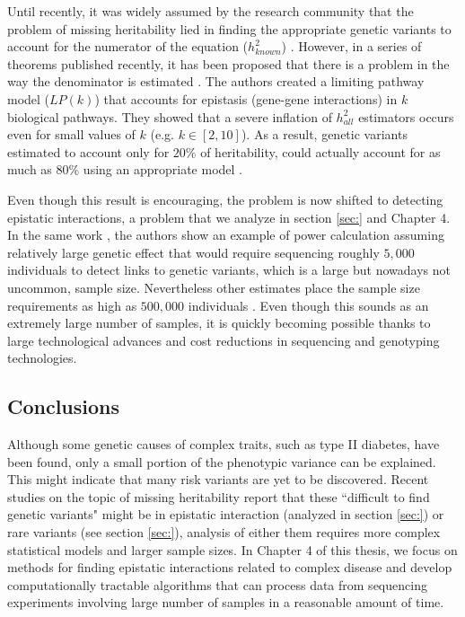 Until recently, it was widely assumed by the research community that the problem of missing heritability lied in finding the appropriate genetic variants to account for the numerator of the equation ($h^2_{known}$) \cite{zuk2012mystery}. However, in a series of theorems published recently, it has been proposed that there is a problem in the way the denominator is estimated \cite{zuk2012mystery}. The authors created a limiting pathway model ($LP(k)$) that accounts for epistasis (gene-gene interactions) in $k$ biological pathways. They showed that a severe inflation of $h^2_{all}$ estimators occurs even for small values of $k$ (e.g. $k \in [2,10]$). As a result, genetic variants estimated to account only for $20\%$ of heritability, could actually account for as much as $80\%$ using an appropriate model \cite{zuk2012mystery}.

Even though this result is encouraging, the problem is now shifted to detecting epistatic interactions, a problem that we analyze in section \ref{sec:} and Chapter 4. In the same work \cite{zuk2012mystery}, the authors show an example of power calculation assuming relatively large genetic effect that would require sequencing roughly $5,000$ individuals to detect links to genetic variants, which is a large but nowadays not uncommon, sample size. Nevertheless other estimates place the sample size requirements as high as  $500,000$ individuals \cite{zuk2012mystery}. Even though this sounds as an extremely large number of samples, it is quickly becoming possible thanks to large technological advances and cost reductions in sequencing and genotyping technologies.

\subsection{Conclusions}

Although some genetic causes of complex traits, such as type II diabetes, have been found, only a small portion of the phenotypic variance can be explained. This might indicate that many risk variants are yet to be discovered. Recent studies on the topic of missing heritability report that these ``difficult to find genetic variants" might be in epistatic interaction (analyzed in section \ref{sec:}) or rare variants (see section \ref{sec:}), analysis of either them requires more complex statistical models and larger sample sizes. In Chapter 4 of this thesis, we focus on methods for finding epistatic interactions related to complex disease and develop computationally tractable algorithms that can process data from sequencing experiments involving large number of samples in a reasonable amount of time.

